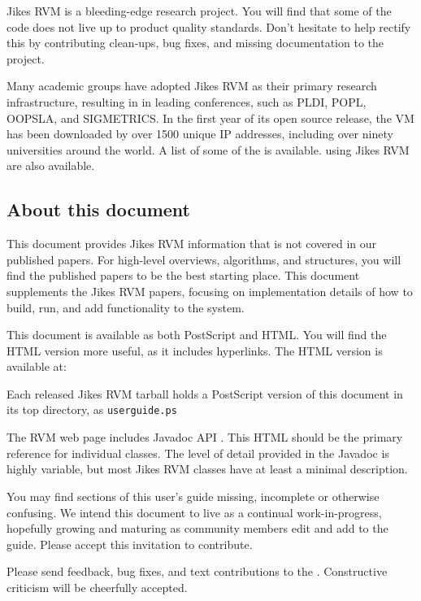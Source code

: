 Jikes RVM is a bleeding-edge research project.  You will find that
some of the code does not live up to product quality standards.  Don't
hesitate to help rectify this by contributing clean-ups, bug fixes,
and missing documentation to the project.

Many academic groups have adopted Jikes RVM as their primary research
infrastructure, resulting in
in leading
conferences, such as PLDI, POPL, OOPSLA, and SIGMETRICS.  In the first year
of its open source release, the VM has been downloaded by over
1500 unique IP addresses, including over ninety
universities around the world. A list
of some of the  is available.
 using
Jikes RVM are also available.

\subsection{About this document}

This document provides Jikes\TMweb{} RVM information that is not
covered in our published papers.  For high-level overviews,
algorithms, and structures, you will find the published papers to be
the best starting place. This document supplements the Jikes RVM
papers, focusing on implementation details of how to build, run,
and add functionality to the system.

This document is available as both PostScript\Rboth{} and HTML.  You will find the
HTML version more useful, as it includes hyperlinks. The HTML version is
available at:
\begin{example}
\xlink{{\tt \RVMUserGuideURL}}{\RVMUserGuideURL}
\end{example}
Each released Jikes RVM tarball holds a PostScript version of this
document in its top directory, as {\tt userguide.ps}


The RVM web page includes Javadoc\TMboth{} API 
. 
This HTML should be the primary reference for individual classes. The
level of detail provided in the Javadoc is highly variable, but most
Jikes RVM classes have at least a minimal description.

You may find sections of this user's guide missing, incomplete or
otherwise confusing. We intend this document to live as a continual
work-in-progress, hopefully growing and maturing as community members
edit and add to the guide.  Please accept this invitation to
contribute.

Please send feedback, bug fixes, and text contributions to the 
.  
Constructive criticism will be cheerfully accepted. 

